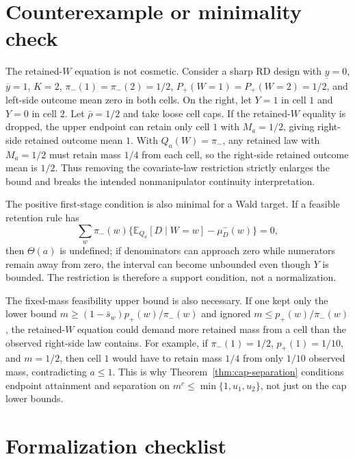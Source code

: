 \documentclass[11pt]{article}
\newcommand{\E}{\mathbb{E}}
\theoremstyle{definition}
\theoremstyle{plain}
\theoremstyle{remark}
\begin{document}
\section{Counterexample or minimality check}
The retained-\(W\) equation is not cosmetic.  Consider a sharp RD design with
\(\underline y=0\), \(\overline y=1\), \(K=2\), \(\pi_-(1)=\pi_-(2)=1/2\),
\(P_+(W=1)=P_+(W=2)=1/2\), and left-side outcome mean zero in both cells.  On the right,
let \(Y=1\) in cell \(1\) and \(Y=0\) in cell \(2\).  Let \(\bar\rho=1/2\) and take loose
cell caps.  If the retained-\(W\) equality is dropped, the upper endpoint can retain only
cell \(1\) with \(M_a=1/2\), giving right-side retained outcome mean \(1\).  With
\(Q_a(W)=\pi_-\), any retained law with \(M_a=1/2\) must retain mass \(1/4\) from each
cell, so the right-side retained outcome mean is \(1/2\).  Thus removing the covariate-law
restriction strictly enlarges the bound and breaks the intended nonmanipulator continuity
interpretation.

The positive first-stage condition is also minimal for a Wald target.  If a feasible
retention rule has
\[
  \sum_w \pi_-(w)\{\E_{Q_a}[D\mid W=w]-\mu^-_D(w)\}=0,
\]
then \(\Theta(a)\) is undefined; if denominators can approach zero while numerators remain
away from zero, the interval can become unbounded even though \(Y\) is bounded.  The
restriction is therefore a support condition, not a normalization.

The fixed-mass feasibility upper bound is also necessary.  If one kept only the lower
bound \(m\ge(1-\bar s_w)p_+(w)/\pi_-(w)\) and ignored
\(m\le p_+(w)/\pi_-(w)\), the retained-\(W\) equation could demand more retained mass from
a cell than the observed right-side law contains.  For example, if
\(\pi_-(1)=1/2\), \(p_+(1)=1/10\), and \(m=1/2\), then cell \(1\) would have to retain
mass \(1/4\) from only \(1/10\) observed mass, contradicting \(a\le1\).  This is why
Theorem~\ref{thm:cap-separation} conditions endpoint attainment and separation on
\(m^c\le\min\{1,u_1,u_2\}\), not just on the cap lower bounds.

\section{Formalization checklist}
\end{document}
